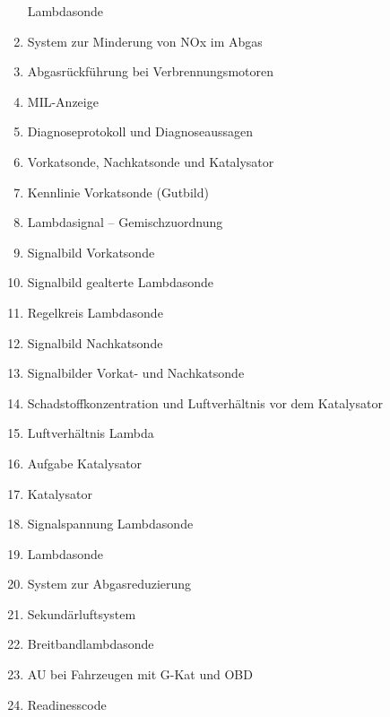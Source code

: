 \begin{enumerate}
  Lambdasonde\\
\item
  System zur Minderung von NOx im Abgas\\
\item
  Abgasrückführung bei Verbrennungsmotoren\\
\item
  MIL-Anzeige\\
\item
  Diagnoseprotokoll und Diagnoseaussagen\\
\item
  Vorkatsonde, Nachkatsonde und Katalysator\\
\item
  Kennlinie Vorkatsonde (Gutbild)\\
\item
  Lambdasignal -- Gemischzuordnung\\
\item
  Signalbild Vorkatsonde\\
\item
  Signalbild gealterte Lambdasonde\\
\item
  Regelkreis Lambdasonde\\
\item
  Signalbild Nachkatsonde\\
\item
  Signalbilder Vorkat- und Nachkatsonde\\
\item
  Schadstoffkonzentration und Luftverhältnis vor dem Katalysator\\
\item
  Luftverhältnis Lambda\\
\item
  Aufgabe Katalysator\\
\item
  Katalysator\\
\item
  Signalspannung Lambdasonde\\
\item
  Lambdasonde\\
\item
  System zur Abgasreduzierung\\
\item
  Sekundärluftsystem\\
\item
  Breitbandlambdasonde\\
\item
  AU bei Fahrzeugen mit G-Kat und OBD\\
\item
  Readinesscode
\end{enumerate}

